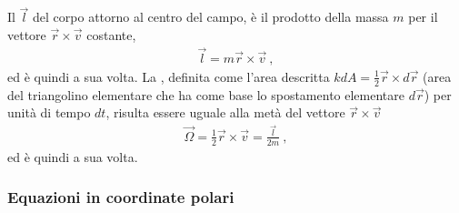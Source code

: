 \documentclass[letterpaper,10pt,italian]{jupyterBook}
\begin{document}
\sphinxAtStartPar
Il  \(\vec{l}\) del corpo attorno al centro del campo, è il prodotto della massa \(m\) per il vettore \(\vec{r} \times \vec{v}\) costante,
\begin{equation*}
\begin{split}\vec{l} = m \vec{r} \times \vec{v} \ ,\end{split}
\end{equation*}
\sphinxAtStartPar
ed è quindi  a sua volta. La , definita come l’area descritta \(\hat{k} dA = \frac{1}{2} \vec{r} \times d \vec{r}\) (area del triangolino elementare che ha come base lo spostamento elementare \(d \vec{r}\)) per unità di tempo \(dt\), risulta essere uguale alla metà del vettore \(\vec{r} \times \vec{v}\)
\begin{equation*}
\begin{split}\vec{\Omega} = \frac{1}{2} \vec{r} \times \vec{v} = \frac{\vec{l}}{2 m} \ ,\end{split}
\end{equation*}
\sphinxAtStartPar
ed è quindi  a sua volta.
\label{\detokenize{ch/mechanics/dynamics-central:physics-hs-mechanics-dynamics-motion-central-polar}}\subsubsection*{Equazioni in coordinate polari}
\end{document}

